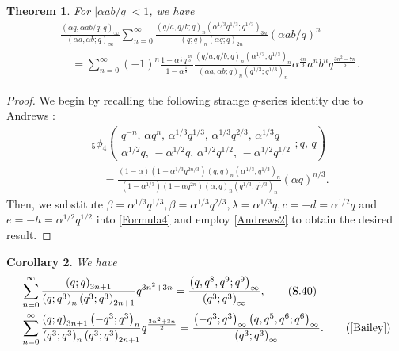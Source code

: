 \documentclass[reqno,12pt]{amsart}
\newtheorem{theorem}{Theorem}[section]%
\newtheorem{corollary}[theorem]{Corollary}
\theoremstyle{remark}
\numberwithin{equation}{section}
\begin{document}
\begin{theorem}\label{theorem2}
For $|\alpha ab/q|<1$, we have
\begin{align*}
&\frac{\left(\alpha q,\alpha ab/q;q\right)_{\infty}}{\left(\alpha a,\alpha b;q\right)_{\infty}}
\sum_{n=0}^{\infty}
\frac{\left(q/a,q/b;q\right)_n\left(\alpha^{1/3} q^{1/3};q^{1/3}\right)_{3n}}{\left(q;q\right)_n\left(\alpha q;q\right)_{2n}}\left(\alpha ab/q\right)^n
\\
&\quad=
\sum_{n=0}^{\infty}\left(-1\right)^n
\frac{1-\alpha^{\frac{1}{3}}q^{\frac{2n}{3}}}{1-\alpha^{\frac{1}{3}}}
\frac{\left(q/a,q/b;q\right)_n\left(\alpha^{1/3};q^{1/3}\right)_n}
{\left(\alpha a,\alpha b;q\right)_n\left(q^{1/3};q^{1/3}\right)_n}\alpha^{\frac{4n}{3}}a^nb^nq^{\frac{3n^2-7n}{6}}.
\end{align*}
\end{theorem}
\begin{proof}
We begin by recalling the following strange $q$-series identity due to Andrews
\cite[Eq. (4.5)]{Andrews}:
\begin{align}
&{_5\phi_4}\left(\begin{array}{ccccc}
q^{-n},\,\alpha q^n,\,\alpha^{1/3}q^{1/3},\,\alpha^{1/3}q^{2/3},\,\alpha^{1/3}q\\
{\alpha}^{1/2}q,\,-\alpha^{1/2}q,\,\alpha^{1/2}q^{1/2},\,-\alpha^{1/2}q^{1/2}
\end{array};q,\,q
\right)\nonumber\\
&\quad=\frac{\left(1-\alpha\right)\left(1-\alpha^{1/3}q^{2n/3}\right)
\left(q;q\right)_n\left(\alpha^{1/3};q^{1/3}\right)_n}
{\left(1-\alpha^{1/3}\right)\left(1-\alpha q^{2n}\right)\left(\alpha;q\right)_n\left(q^{1/3};q^{1/3}\right)_n}\left(\alpha q\right)^{n/3}.
\label{Andrews2}
\end{align}
Then, we substitute $\beta=\alpha^{1/3}q^{1/3}, \beta=\alpha^{1/3}q^{2/3}, \lambda=\alpha^{1/3}q, c=-d=\alpha^{1/2}q$ and 
$e=-h=\alpha^{1/2}q^{1/2}$ into \eqref{Formula4} and employ \eqref{Andrews2} to obtain the desired result.
\end{proof}
\begin{corollary}
We have
\begin{align}
&\sum_{n=0}^{\infty}\frac{\left(q;q\right)_{3n+1}}
{\left(q;q^3\right)_n\left(q^3;q^3\right)_{2n+1}}q^{3n^2+3n}
=\frac{\left(q,q^8,q^9;q^9\right)_{\infty}}{\left(q^3;q^3\right)_{\infty}}
,\tag{S.40}\label{S.40}\\
&\sum_{n=0}^{\infty}\frac{\left(q;q\right)_{3n+1}\left(-q^3;q^3\right)_n
}
{\left(q^3;q^3\right)_n\left(q^3;q^3\right)_{2n+1}}
q^{\frac{{3n^2+3n}}{2}}
=\frac{\left(-q^3;q^3\right)_{\infty}
\left(q,q^5,q^6;q^6\right)_{\infty}}{\left(q^3;q^3\right)_{\infty}}.\tag{\cite[Eq. (7.3)]{Bailey}}\label{new5}
\end{align}
\end{corollary}
\end{document}
